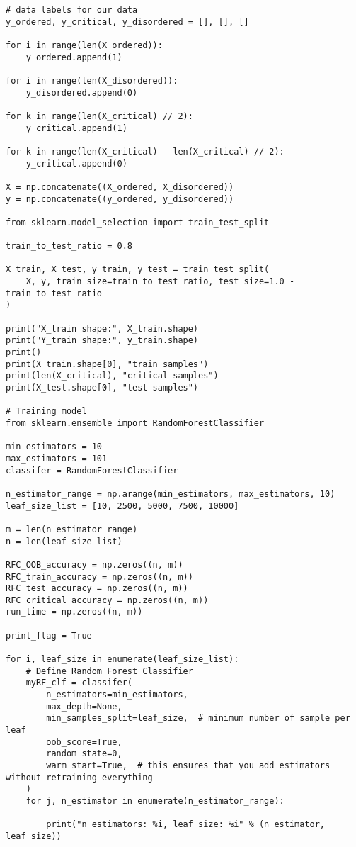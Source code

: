 \begin{verbatim}
# data labels for our data
y_ordered, y_critical, y_disordered = [], [], []

for i in range(len(X_ordered)):
    y_ordered.append(1)

for i in range(len(X_disordered)):
    y_disordered.append(0)

for k in range(len(X_critical) // 2):
    y_critical.append(1)

for k in range(len(X_critical) - len(X_critical) // 2):
    y_critical.append(0)

X = np.concatenate((X_ordered, X_disordered))
y = np.concatenate((y_ordered, y_disordered))

from sklearn.model_selection import train_test_split

train_to_test_ratio = 0.8

X_train, X_test, y_train, y_test = train_test_split(
    X, y, train_size=train_to_test_ratio, test_size=1.0 - train_to_test_ratio
)

print("X_train shape:", X_train.shape)
print("Y_train shape:", y_train.shape)
print()
print(X_train.shape[0], "train samples")
print(len(X_critical), "critical samples")
print(X_test.shape[0], "test samples")

# Training model
from sklearn.ensemble import RandomForestClassifier

min_estimators = 10
max_estimators = 101
classifer = RandomForestClassifier

n_estimator_range = np.arange(min_estimators, max_estimators, 10)
leaf_size_list = [10, 2500, 5000, 7500, 10000]

m = len(n_estimator_range)
n = len(leaf_size_list)

RFC_OOB_accuracy = np.zeros((n, m))
RFC_train_accuracy = np.zeros((n, m))
RFC_test_accuracy = np.zeros((n, m))
RFC_critical_accuracy = np.zeros((n, m))
run_time = np.zeros((n, m))

print_flag = True

for i, leaf_size in enumerate(leaf_size_list):
    # Define Random Forest Classifier
    myRF_clf = classifer(
        n_estimators=min_estimators,
        max_depth=None,
        min_samples_split=leaf_size,  # minimum number of sample per leaf
        oob_score=True,
        random_state=0,
        warm_start=True,  # this ensures that you add estimators without retraining everything
    )
    for j, n_estimator in enumerate(n_estimator_range):

        print("n_estimators: %i, leaf_size: %i" % (n_estimator, leaf_size))


\end{verbatim}
